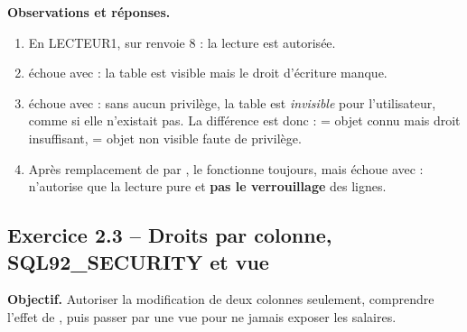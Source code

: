 \textbf{Observations et réponses.}
\begin{enumerate}
  \item En LECTEUR1,  sur  renvoie 8 : la lecture est autorisée.
  \item {} échoue avec  : la table est visible mais le droit d'écriture manque.
  \item {} échoue avec  : sans aucun privilège, la table est \emph{invisible} pour l'utilisateur, comme si
        elle n'existait pas. La différence est donc :  = objet connu mais droit insuffisant,
         = objet non visible faute de privilège.
  \item Après remplacement de  par , le  fonctionne toujours, mais
         échoue avec  : 
        n'autorise que la lecture pure et \textbf{pas le verrouillage} des lignes.
\end{enumerate}


\subsection{Exercice 2.3 -- Droits par colonne, SQL92\_SECURITY et vue}
\textbf{Objectif.} Autoriser la modification de deux colonnes seulement, comprendre l'effet de
, puis passer par une vue pour ne jamais exposer les salaires.


